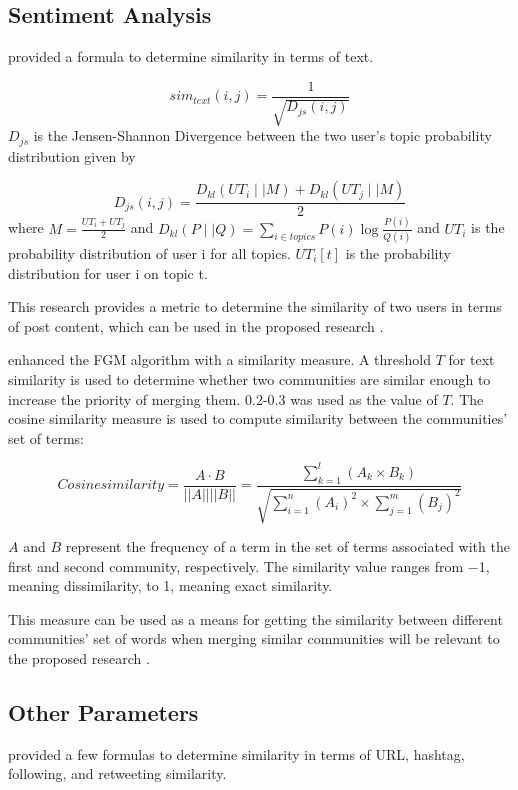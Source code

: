 \subsection{Sentiment Analysis}

 provided a formula to determine similarity in terms of text. 

\begin{equation}
	sim_{text}(i,j) = \frac{1}{\sqrt{D_{js}(i,j)}}
\end{equation}$D_{js}$ is the Jensen-Shannon Divergence between the two user’s topic probability distribution given by

\begin{equation}
	D_{js}(i,j) = \frac{D_{kl}(UT_i \mid\mid M) + D_{kl}(UT_j \mid\mid M)}{2}
\end{equation}where $M = \frac{UT_i + UT_j}{2}$ and $D_{kl}(P \mid\mid Q) = \sum_{i \in topics} P(i) \log{\frac{P(i)}{Q(i)}}$ and $UT_i$ is the probability distribution of user i for all topics. $UT_i[t]$ is the probability distribution for user i on topic t.

This research provides a metric to determine the similarity of two users in terms of post content, which can be used in the proposed research \cite{Zhang:2012}.

 enhanced the FGM algorithm with a similarity measure. A threshold $T$ for text similarity is used to determine whether two communities are similar enough to increase the priority of merging them. 0.2-0.3 was used as the value of $T$. The cosine similarity measure is used to compute similarity between the communities' set of terms:

\begin{equation}
	Cosine similarity = \frac {A \cdot B}{||A|| ||B||} = \frac {\sum_{k = 1}^{l}(A_k \times B_k)}{\sqrt{\sum_{i = 1}^{n} (A_i)^2 \times \sum_{j = 1}^{m} (B_j)^2}}
\end{equation}

$A$ and $B$ represent the frequency of a term in the set of terms associated with the first and second community, respectively. The similarity value ranges from −1, meaning dissimilarity, to 1, meaning exact similarity.

This measure can be used as a means for getting the similarity between different communities’ set of words when merging similar communities will be relevant to the proposed research \cite{Bakillah:2014}.

\subsection{Other Parameters}
 provided a few formulas to determine similarity in terms of URL, hashtag, following, and retweeting similarity.

